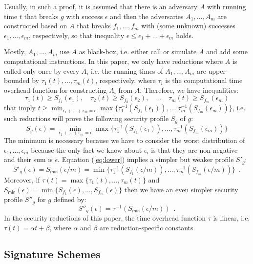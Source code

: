 \documentclass{article}
\begin{document}
Usually, in such a proof, it is assumed that there is an adversary $A$ with running time $t$ that breaks $g$ with success $\epsilon$ and then the adversaries $A_1,\ldots, A_m$ are constructed based on $A$ that breaks $f_1,\ldots,f_m$ with (some unknown) successes $\epsilon_1,\ldots,\epsilon_m$, respectively, so that inequality $\epsilon\le \epsilon_1 + \ldots + \epsilon_m$ holds.

Mostly, $A_1, \ldots, A_m$ use $A$ as black-box, i.e. either call or simulate $A$ and add some computational instructions. In this paper, we only have reductions where $A$ is called only once by every $A_i$ i.e. the running times of $A_1,\ldots,A_m$ are upper-bounded by $\tau_1(t), \ldots, \tau_m(t)$, respectively, where $\tau_i$ is the computational time overhead function for constructing $A_i$ from $A$.
Therefore, we have inequalities:
\[
\tau_1(t) \ge S_{f_1}(\epsilon_1), \quad \tau_2(t) \ge S_{f_2}(\epsilon_2), \quad \ldots\quad
\tau_m(t)\ge S_{f_m}(\epsilon_m)
\]
that imply $t\ge \min_{\epsilon_1 + \ldots + \epsilon_m = \epsilon}\max\{\tau^{-1}_1(S_{f_1}(\epsilon_1)), \ldots, \tau^{-1}_m(S_{f_m}(\epsilon_m))\}$, i.e. such reductions will prove the following security profile $S_g$ of $g$:
\begin{equation}\label{eq:lower}
S_g(\epsilon) = \min_{\epsilon_1 + \ldots + \epsilon_m = \epsilon}\max\{\tau^{-1}_1(S_{f_1}(\epsilon_1)), \ldots, \tau^{-1}_m(S_{f_m}(\epsilon_m))\}
\end{equation}
The minimum is necessary because we have to consider the worst distribution of $\epsilon_1,\ldots, \epsilon_m$ because the only fact we know about $\epsilon_i$ is that they are non-negative and their sum is $\epsilon$.
Equation (\ref{eq:lower}) implies a simpler but weaker profile $S'_g$:
\[
S'_g(\epsilon) = S_\mathsf{min}(\epsilon /m) =
 \min\{\tau^{-1}_1(S_{f_1}(\epsilon/m)), \ldots, \tau^{-1}_m(S_{f_m}(\epsilon/m))\}\enspace.
\]
Moreover, if $\tau(t)=\max\{\tau_1(t), \ldots, \tau_m(t)\}$ and $S_\mathsf{min}(\epsilon)= \min\{S_{f_1}(\epsilon), \ldots, S_{f_m}(\epsilon)\}$ then we have an even simpler security profile $S''_g$ for $g$ defined by:
\begin{equation}\label{eq:losebound}
S''_g(\epsilon) = \tau^{-1}(S_\mathsf{min}(\epsilon/m))\enspace.
\end{equation}
In the security reductions of this paper, the time overhead function $\tau$ is linear, i.e. $\tau(t) = \alpha t + \beta$, where $\alpha$ and $\beta$ are reduction-specific constants.

\subsection{Signature Schemes}
\end{document}
